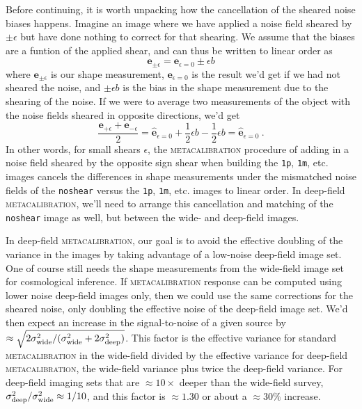 \documentclass[twocolumn]{openjournal}
\makeatletter
\newcommand{\mcal}{\textsc{metacalibration}\@\xspace}
\newcommand{\noshear}{\texttt{noshear}\@\xspace}
\makeatother
\begin{document}
Before continuing, it is worth unpacking how the cancellation of the sheared noise
biases happens.  Imagine an image where we have applied a noise field sheared by
$\pm\epsilon$ but have done nothing to correct for that shearing.  We assume
that the biases are a funtion of the applied shear, and can thus be written
to linear order as
\begin{equation*}
\mathbf{e}_{\pm\epsilon} = \mathbf{e}_{\epsilon=0} \pm \epsilon b
\end{equation*}
where $\mathbf{e}_{\pm\epsilon}$ is our shape measurement,
$\mathbf{e}_{\epsilon=0}$ is the result we'd get if we had not sheared the noise, and
$\pm \epsilon b$ is the bias in the shape measurement due to the shearing of the noise.
If we were to average two measurements of the object with the noise fields sheared in
opposite directions, we'd get
\begin{equation*}
\frac{\mathbf{e}_{+\epsilon} + \mathbf{e}_{-\epsilon}}{2}
= \hat{\mathbf{e}}_{\epsilon=0} + \frac{1}{2}\epsilon b - \frac{1}{2}\epsilon b
= \hat{\mathbf{e}}_{\epsilon=0}\ .
\end{equation*}
In other words, for small shears $\epsilon$, the \mcal procedure of adding in a noise
field sheared by the opposite sign shear when building the \texttt{1p}, \texttt{1m}, etc.
images cancels the differences in shape measurements under the mismatched noise fields
of the \noshear versus the \texttt{1p}, \texttt{1m}, etc. images to linear order. In
deep-field \mcal, we'll need to arrange this cancellation and matching of the \noshear
image as well, but between the wide- and deep-field images.

In deep-field \mcal, our goal is to avoid the effective doubling of the variance in the
images by taking advantage of a low-noise deep-field image set. One of course still
needs the shape measurements from the wide-field image set for cosmological inference.
If \mcal response can be computed using lower noise
deep-field images only, then we could use the same corrections for the sheared
noise, only doubling the effective noise of the deep-field image set. We'd then expect
an increase in the signal-to-noise of a given source by
$\approx\sqrt{2\sigma^2_{\rm wide}/(\sigma^2_{\rm wide} + 2\sigma^2_{\rm deep})}$.
This factor is the effective variance for standard \mcal in the wide-field divided by
the effective variance for deep-field \mcal, the wide-field variance plus twice the
deep-field variance. For deep-field imaging sets that are $\approx10\times$ deeper than
the wide-field survey, $\sigma^{2}_{\rm deep}/\sigma^{2}_{\rm wide}\approx 1/10$, and
this factor is $\approx1.30$ or about a $\approx30\%$ increase.
\end{document}

